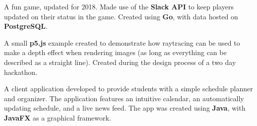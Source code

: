 \documentclass[10pt,letter,normalphoto]{altacv}
\begin{document}

\begin{fullwidth}
  \makecvheader
\end{fullwidth}

  A fun game, updated for 2018. Made use of the \textbf{Slack API} to keep players updated on their status in the game.
  Created using \textbf{Go}, with data hosted on \textbf{PostgreSQL}.

  \divider

  A small \textbf{p5.js} example created to demonstrate how raytracing can be used to make a depth effect when rendering images (as long as everything can be described as a straight line).
  Created during the design process of a two day hackathon.
  
  \divider



  A client application developed to provide students with a simple schedule planner and organizer.
  The application features an intuitive calendar, an automatically updating schedule, and a live news feed.
  The app was created using \textbf{Java}, with \textbf{JavaFX} as a graphical framework.
\end{document}
